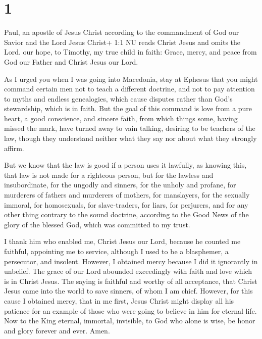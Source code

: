 \hypertarget{section}{%
\section{1}\label{section}}

 Paul, an apostle of Jesus Christ according to the
commandment of God our Savior and the Lord Jesus Christ+ 1:1 NU reads
Christ Jesus and omits the Lord. our hope,  to Timothy, my
true child in faith: Grace, mercy, and peace from God our Father and
Christ Jesus our Lord.

 As I urged you when I was going into Macedonia, stay at
Ephesus that you might command certain men not to teach a different
doctrine,  and not to pay attention to myths and endless
genealogies, which cause disputes rather than God's stewardship, which
is in faith.  But the goal of this command is love from a
pure heart, a good conscience, and sincere faith,  from
which things some, having missed the mark, have turned away to vain
talking,  desiring to be teachers of the law, though they
understand neither what they say nor about what they strongly affirm.

 But we know that the law is good if a person uses it
lawfully,  as knowing this, that law is not made for a
righteous person, but for the lawless and insubordinate, for the ungodly
and sinners, for the unholy and profane, for murderers of fathers and
murderers of mothers, for manslayers,  for the sexually
immoral, for homosexuals, for slave-traders, for liars, for perjurers,
and for any other thing contrary to the sound doctrine, 
according to the Good News of the glory of the blessed God, which was
committed to my trust.

 I thank him who enabled me, Christ Jesus our Lord, because
he counted me faithful, appointing me to service,  although
I used to be a blasphemer, a persecutor, and insolent. However, I
obtained mercy because I did it ignorantly in unbelief. 
The grace of our Lord abounded exceedingly with faith and love which is
in Christ Jesus.  The saying is faithful and worthy of all
acceptance, that Christ Jesus came into the world to save sinners, of
whom I am chief.  However, for this cause I obtained mercy,
that in me first, Jesus Christ might display all his patience for an
example of those who were going to believe in him for eternal life.
 Now to the King eternal, immortal, invisible, to God who
alone is wise, be honor and glory forever and ever. Amen.

